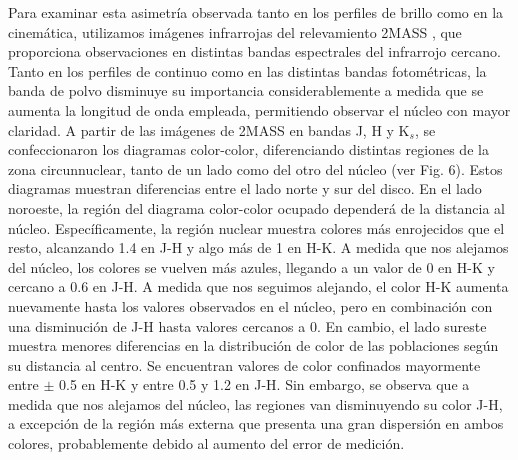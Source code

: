 \documentclass[baaa]{baaa}
\begin{document}
Para examinar esta asimetría observada tanto en los perfiles de brillo como en la cinemática, utilizamos imágenes infrarrojas del relevamiento 2MASS \citep{2006AJ....131.1163S}, que proporciona observaciones en distintas bandas espectrales del infrarrojo cercano. Tanto en los perfiles de continuo como en las distintas bandas fotométricas, la banda de polvo disminuye su importancia considerablemente a medida que se aumenta la longitud de onda empleada, permitiendo observar el núcleo con mayor claridad. A partir de las imágenes de 2MASS en bandas J, H y K$_{s}$, se confeccionaron los diagramas color-color, diferenciando distintas regiones de la zona circunnuclear, tanto de un lado como del otro del núcleo (ver Fig. 6). Estos diagramas muestran diferencias entre el lado norte y sur del disco.  En el lado noroeste, la región del diagrama color-color ocupado dependerá de la distancia al núcleo. Específicamente, la región nuclear muestra colores más enrojecidos que el resto, alcanzando 1.4 en J-H y algo más de 1 en H-K. A medida que nos alejamos del núcleo, los colores se vuelven más azules, llegando a un valor de 0 en H-K y cercano a 0.6 en J-H. A medida que nos seguimos alejando, el color H-K aumenta nuevamente hasta los valores observados en el núcleo, pero en combinación con una disminución de J-H hasta valores cercanos a 0. En cambio, el lado sureste  muestra menores diferencias en la distribución de color de las poblaciones según su distancia al centro. Se encuentran valores de color confinados mayormente entre $\pm$ 0.5 en H-K y entre 0.5 y 1.2 en J-H. Sin embargo, se observa que a medida que nos alejamos del núcleo, las regiones van disminuyendo su color J-H, a excepción de la región más externa que presenta una gran dispersión en ambos colores, probablemente debido al aumento del error de medición.
\end{document}
